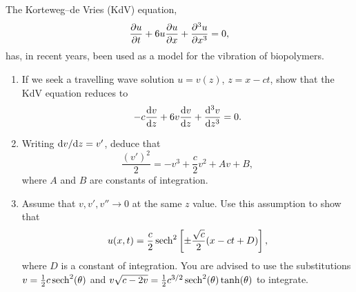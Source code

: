 \documentclass[a4paper, 12pt]{article}
\begin{document}
\begin{enumerate}[label={\bf \arabic{*}.\;}, ref={\arabic{*}},itemsep=3ex, left=0ex]
    {
      The Korteweg--de Vries (KdV) equation,
      \begin{equation}
        \pd{u}{t} + 6 u\pd{u}{x} + \pddd{u}{x}=0,
      \end{equation}
      has, in recent years, been used as a model for the vibration of biopolymers.
      \begin{enumerate}[label=(\alph*)]
        \item If we seek a travelling wave solution $u = v(z)$, $z= x-ct$, show that the KdV equation reduces to
          \begin{equation}
            \label{kdvo}
            -c \fd{v}{z}  + 6 v\fd{v}{z} + \fddd{v}{z} =0 .
          \end{equation}

        \item Writing $\fd{v}{z} = v'$, deduce that
          \begin{equation}
            \frac{(v')^2}{2} = -v^3 + \frac{c}{2}v^2 + Av + B,
          \end{equation}
          where $A$ and $B$ are constants of integration.

        \item Assume that $v,v', v''\to 0$ at the same $z$ value.  Use this assumption to show that
          \begin{equation}
            u(x,t) = \frac{c}{2}\operatorname{sech}^2\left[\pm \frac{\sqrt{c}}{2}(x-ct + D) \right],
          \end{equation}
          where $D$ is a constant of integration. You are advised to use the substitutions $v= \frac{1}{2}c\operatorname{sech}^2(\theta)$  and $v\sqrt{c-2v} =\frac{1}{2}c^{3/2}\operatorname{sech}^2(\theta)\tanh(\theta)$ to integrate.


\end{enumerate}}
\end{enumerate}
\end{document}
